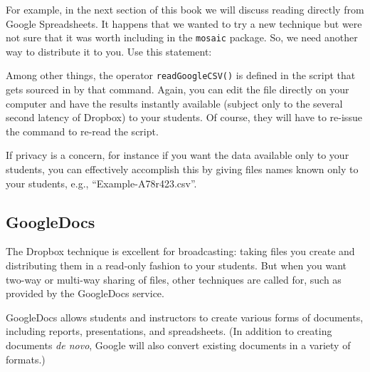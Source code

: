 For example, in the next section of this book we will discuss reading
directly from Google Spreadsheets.  It happens that we wanted to try a
new technique but were not sure that it was worth including in the
\texttt{mosaic} package.  So, we need another way to distribute it to
you.  Use this statement:
\begin{knitrout}
\end{knitrout}

Among other things, the operator \texttt{readGoogleCSV()} is defined
in the script that gets sourced in by that command.  Again, you can
edit the file directly on your computer and have the results instantly
available (subject only to the several second latency of Dropbox) to
your students.  Of course, they will have to re-issue the
 command to re-read the script.

If privacy is a concern, for instance if you want the data available
only to your students, you can effectively accomplish this 
by giving files names known only to your students, e.g.,
``Example-A78r423.csv''.  




\subsection{GoogleDocs}

The Dropbox technique is excellent for broadcasting: taking files you
create and distributing them in a read-only fashion to your students.
But when you want two-way or multi-way
sharing of files, other techniques are called for, such as provided by
the GoogleDocs service.

GoogleDocs allows students and instructors to create various forms of
documents, including reports, presentations, and spreadsheets. (In
addition to creating documents {\em de novo}, Google will also convert
existing documents in a variety of formats.)


